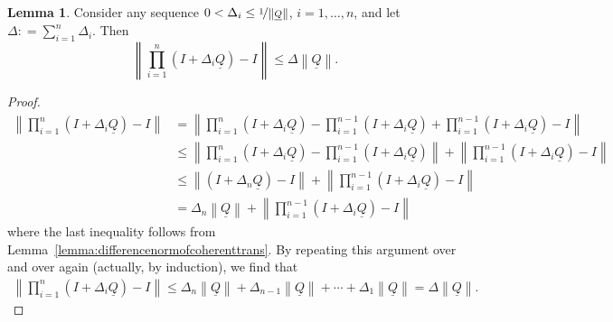 \documentclass[10pt]{paper}
\theoremstyle{definition}
\newtheorem{lemma}[theorem]{Lemma}
\newcommand{\lrate}{\underline{Q}}
\newcommand{\norm}[1]{\left\lVert #1 \right\rVert}
\newcommand{\coloneqq}{:\!=}
\begin{document}
\begin{lemma}\label{lemma:justtheindicator}
Consider any sequence $0<\Delta_i\leq\nicefrac{1}{\norm{\lrate}}$, $i=1,\dots,n$, and let $\Delta\coloneqq\sum_{i=1}^n\Delta_i$. Then
\begin{equation*}
\norm{\prod_{i=1}^n(I+\Delta_i\lrate)-I}\leq\Delta\norm{\lrate}.
\end{equation*}
\end{lemma}
\begin{proof}
\begin{align*}
\norm{\prod_{i=1}^n(I+\Delta_i\lrate)-I}
&=\norm{\prod_{i=1}^n(I+\Delta_i\lrate)-\prod_{i=1}^{n-1}(I+\Delta_i\lrate)+\prod_{i=1}^{n-1}(I+\Delta_i\lrate)-I}\\
&\leq\norm{\prod_{i=1}^n(I+\Delta_i\lrate)-\prod_{i=1}^{n-1}(I+\Delta_i\lrate)}+\norm{\prod_{i=1}^{n-1}(I+\Delta_i\lrate)-I}\\
&\leq\norm{(I+\Delta_n\lrate)-I}+\norm{\prod_{i=1}^{n-1}(I+\Delta_i\lrate)-I}\\
&=\Delta_n\norm{\lrate}+\norm{\prod_{i=1}^{n-1}(I+\Delta_i\lrate)-I}
\end{align*}
where the last inequality follows from Lemma~\ref{lemma:differencenormofcoherenttrans}. By repeating this argument over and over again (actually, by induction), we find that
\begin{align*}
\norm{\prod_{i=1}^n(I+\Delta_i\lrate)-I}
\leq \Delta_n\norm{\lrate} +\Delta_{n-1}\norm{\lrate}+\cdots
+\Delta_1\norm{\lrate}
=\Delta\norm{\lrate}.
\end{align*}
\end{proof}
\end{document}
